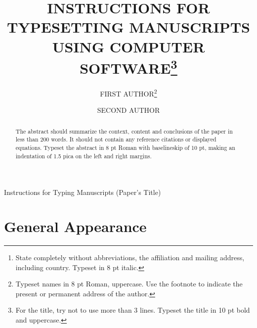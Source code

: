 \documentclass{ws-ijsc}
\begin{document}
{Instructions for Typing Manuscripts (Paper's Title)}

%
\catchline{}{}{}{}{}
%

\title{INSTRUCTIONS FOR TYPESETTING MANUSCRIPTS \\
USING COMPUTER SOFTWARE\footnote{For the title, try not to 
use more than 3 lines. Typeset the title in 10 pt bold and uppercase.}}

\author{FIRST AUTHOR\footnote{
Typeset names in 8 pt Roman, uppercase. Use the footnote to indicate the
present or permanent address of the author.}}

\address{University Department, University Name, Address\\
City, State ZIP/Zone,Country\,\footnote{State completely without 
abbreviations, the affiliation and mailing address, 
including country. Typeset in 8 pt italic.}\\
}

\author{SECOND AUTHOR}

\address{Group, Laboratory, Address\\
City, State ZIP/Zone, Country\\
author\_id@domain\_name
}

\maketitle

\begin{history}
\end{history}

\begin{abstract}
The abstract should summarize the context, content and conclusions of
the paper in less than 200 words. It should not contain any reference
citations or displayed equations. Typeset the abstract in 8 pt Roman
with baselineskip of 10 pt, making an indentation of 1.5 pica on the
left and right margins.
\end{abstract}


\section{General Appearance \label{ga}}	
\end{document}
